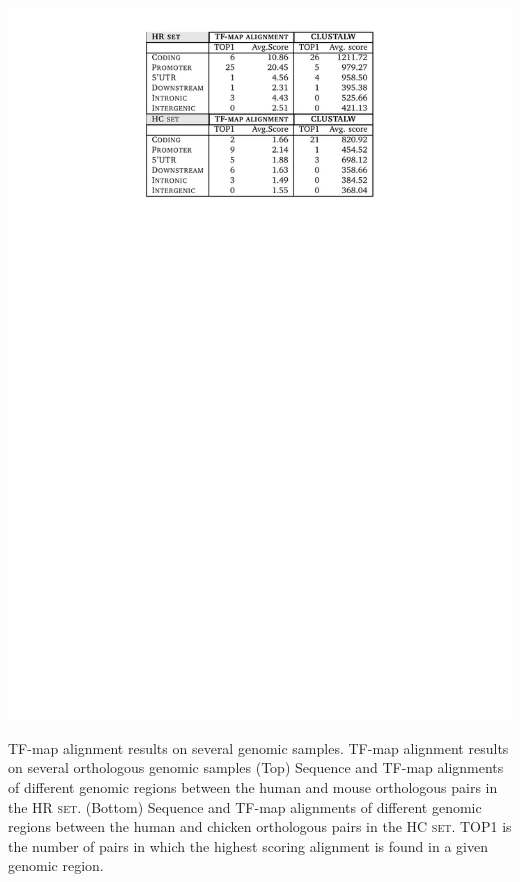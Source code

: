 \begin{table}[t!]
\begin{center}
\begin{minipage}{0.98\linewidth}\setlength{\parindent}{0pt}
\begin{center}
\includegraphics[bb=161 608 434 816,clip]{tables/testregions}
\end{center}
\end{minipage}
          {TF-map alignment results on several genomic samples.}%
          {TF-map alignment results on several orthologous genomic samples}%
          {(Top) Sequence and TF-map alignments of different genomic regions
           between the human and mouse orthologous pairs in the \textsc{HR set}. 
           (Bottom) Sequence and TF-map alignments of different genomic regions
           between the human and chicken orthologous pairs in the \textsc{HC set}.
           TOP1 is the number of pairs in which the highest scoring alignment is found 
           in a given genomic region.}
\end{center}
\end{table}

